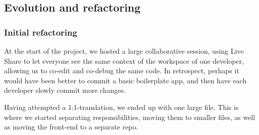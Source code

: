 \subsection{Evolution and refactoring}

\subsubsection{Initial refactoring}

At the start of the project, we hosted a large collaborative session, using Live Share \cite{tool:live-share} to let everyone see the same context of the workspace of one developer, allowing us to co-edit and co-debug the same code.
In retrospect, perhaps it would have been better to commit a basic boilerplate app, and then have each developer slowly commit more changes.

Having attempted a 1:1-translation, we ended up with one large file. This is where we started separating responsibilities, moving them to smaller files, as well as moving the front-end to a separate repo.
